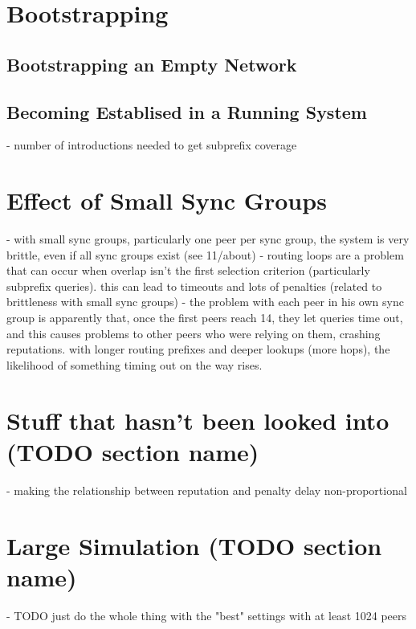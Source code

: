 \section{Bootstrapping}
\label{sec:rep_avail_bootstrapping}
\subsection{Bootstrapping an Empty Network}
\subsection{Becoming Establised in a Running System}
- number of introductions needed to get subprefix coverage

\section{Effect of Small Sync Groups}
- with small sync groups, particularly one peer per sync group, the system is
  very brittle, even if all sync groups exist (see 11/about)
- routing loops are a problem that can occur when overlap isn't the first
  selection criterion (particularly subprefix queries). this can lead to
  timeouts and lots of penalties (related to brittleness with small sync groups)
- the problem with each peer in his own sync group is apparently that, once the
  first peers reach 14, they let queries time out, and this causes problems to
  other peers who were relying on them, crashing reputations. with longer
  routing prefixes and deeper lookups (more hops), the likelihood of something
  timing out on the way rises.

\section{Stuff that hasn't been looked into (TODO section name)}
- making the relationship between reputation and penalty delay non-proportional

\section{Large Simulation (TODO section name)}
- TODO just do the whole thing with the "best" settings with at least 1024 peers


